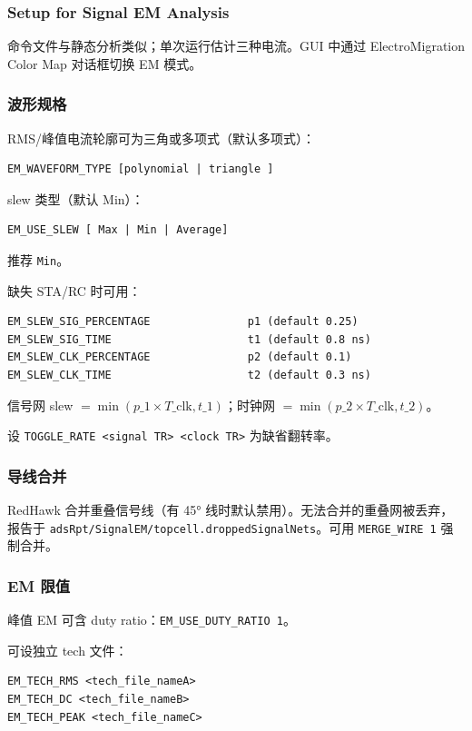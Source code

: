 \subsubsection*{Setup for Signal EM Analysis}

命令文件与静态分析类似；单次运行估计三种电流。GUI 中通过 ElectroMigration Color Map 对话框切换 EM 模式。

\subsubsection{波形规格}
RMS/峰值电流轮廓可为三角或多项式（默认多项式）：
\begin{lstlisting}
EM_WAVEFORM_TYPE [polynomial | triangle ]
\end{lstlisting}

slew 类型（默认 Min）：
\begin{lstlisting}
EM_USE_SLEW [ Max | Min | Average]
\end{lstlisting}
推荐 \texttt{Min}。

缺失 STA/RC 时可用：
\begin{lstlisting}
EM_SLEW_SIG_PERCENTAGE               p1 (default 0.25)
EM_SLEW_SIG_TIME                     t1 (default 0.8 ns)
EM_SLEW_CLK_PERCENTAGE               p2 (default 0.1)
EM_SLEW_CLK_TIME                     t2 (default 0.3 ns)
\end{lstlisting}
信号网 slew $= \min(p\_1 \times T\_{\mathrm{clk}}, t\_1)$；时钟网 $= \min(p\_2 \times T\_{\mathrm{clk}}, t\_2)$。

设 \texttt{TOGGLE\_RATE <signal TR> <clock TR>} 为缺省翻转率。

\subsubsection{导线合并}
RedHawk 合并重叠信号线（有 45° 线时默认禁用）。无法合并的重叠网被丢弃，报告于 \texttt{adsRpt/SignalEM/topcell.droppedSignalNets}。可用 \texttt{MERGE\_WIRE 1} 强制合并。

\subsubsection{EM 限值}
峰值 EM 可含 duty ratio：\texttt{EM\_USE\_DUTY\_RATIO 1}。

可设独立 tech 文件：
\begin{lstlisting}
EM_TECH_RMS <tech_file_nameA>
EM_TECH_DC <tech_file_nameB>
EM_TECH_PEAK <tech_file_nameC>
\end{lstlisting}

